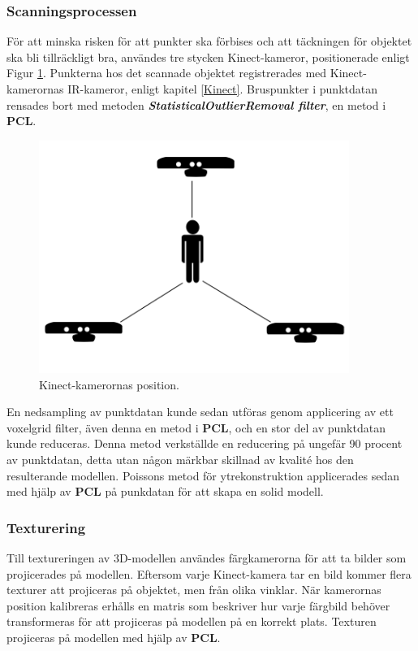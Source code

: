 \documentclass[a4paper,12pt,oneside,final]{extbook}
\begin{document}
\subsubsection{Scanningsprocessen}
För att minska risken för att punkter ska förbises och att täckningen för objektet ska bli tillräckligt bra, användes tre stycken Kinect-kameror, positionerade enligt Figur \ref{fig:kinect}. Punkterna hos det scannade objektet registrerades med Kinect-kamerornas IR-kameror, enligt kapitel \ref{Kinect}. Bruspunkter i punktdatan rensades bort med metoden \textbf{\emph{StatisticalOutlierRemoval filter}}, en metod i \textbf{PCL}.

\begin{figure}[tb]
  \centering
  \includegraphics[width=0.9\textwidth]{bilder/setup.png}
  \caption{Kinect-kamerornas position.}
  \label{fig:kinect}
\end{figure}


En nedsampling av punktdatan kunde sedan utföras genom applicering av ett voxelgrid filter, även denna en metod i \textbf{PCL}, och en stor del av punktdatan kunde reduceras. Denna metod verkställde en reducering på ungefär 90 procent av punktdatan, detta utan någon märkbar skillnad av kvalité hos den resulterande modellen. Poissons metod för ytrekonstruktion applicerades sedan med hjälp av \textbf{PCL} på punkdatan för att skapa en solid modell\cite{cluster}.

\subsubsection{Texturering}
Till textureringen av 3D-modellen användes färgkamerorna för att ta bilder som projicerades på modellen. Eftersom varje Kinect-kamera tar en bild kommer flera texturer att projiceras på objektet, men från olika vinklar. När kamerornas position kalibreras erhålls en matris som beskriver hur varje färgbild behöver transformeras för att projiceras på modellen på en korrekt plats. Texturen projiceras på modellen med hjälp av \textbf{PCL}.
\end{document}
